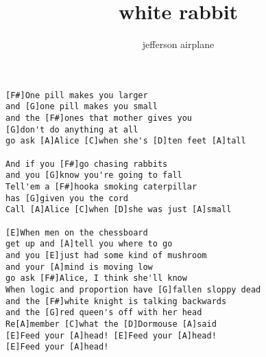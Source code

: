 \author{jefferson airplane}
\title{white rabbit}
\maketitle
\begin{verbatim}
[F#]One pill makes you larger
and [G]one pill makes you small
and the [F#]ones that mother gives you
[G]don't do anything at all
go ask [A]Alice [C]when she's [D]ten feet [A]tall

And if you [F#]go chasing rabbits
and you [G]know you're going to fall
Tell'em a [F#]hooka smoking caterpillar
has [G]given you the cord
Call [A]Alice [C]when [D]she was just [A]small

[E]When men on the chessboard 
get up and [A]tell you where to go
and you [E]just had some kind of mushroom
and your [A]mind is moving low
go ask [F#]Alice, I think she'll know
When logic and proportion have [G]fallen sloppy dead
and the [F#]white knight is talking backwards
and the [G]red queen's off with her head
Re[A]member [C]what the [D]Dormouse [A]said
[E]Feed your [A]head! [E]Feed your [A]head!
[E]Feed your [A]head!
\end{verbatim}
